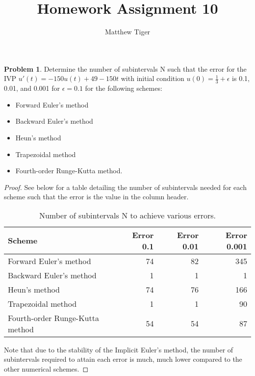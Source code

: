 \documentclass[12pt]{article}
\title{Homework Assignment 10}
\author{Matthew Tiger}
\theoremstyle{definition}
\newtheorem{problem}{Problem}
\begin{document}
\maketitle


\begin{problem} Determine the number of subintervals N such that the error for
  the IVP $u'(t) = -150 u(t) +49 - 150t$ with initial condition $u(0) = \frac{1}{3} + \epsilon$
  is 0.1, 0.01, and 0.001 for $\epsilon = 0.1$ for the following schemes:
  \begin{itemize}
    \item Forward Euler's method
    \item Backward Euler's method
    \item Heun's method
    \item Trapezoidal method
    \item Fourth-order Runge-Kutta method.
  \end{itemize}
\end{problem}

\begin{proof}
See below for a table detailing the number of subintervals needed for each
scheme such that the error is the value in the column header.

\begin{table}[h!]
  \begin{center}
    \label{tab:table1}
    \begin{tabular}{|l|r|r|r|}
      \hline
      \textbf{Scheme} & \textbf{Error 0.1} & \textbf{Error 0.01} & \textbf{Error 0.001}\\
      \hline
      Forward Euler's method & 74 & 82 & 345 \\
      Backward Euler's method & 1 & 1 & 1 \\
      Heun's method & 74 & 76 & 166 \\
      Trapezoidal method & 1 & 1 & 90 \\
      Fourth-order Runge-Kutta method & 54 & 54 & 87\\
      \hline
    \end{tabular}
    \caption{Number of subintervals N to achieve various errors.}
  \end{center}
\end{table}

Note that due to the stability of the Implicit Euler's method, the number of
subintervals required to attain each error is much, much lower compared to the
other numerical schemes.
\end{proof}
\end{document}
